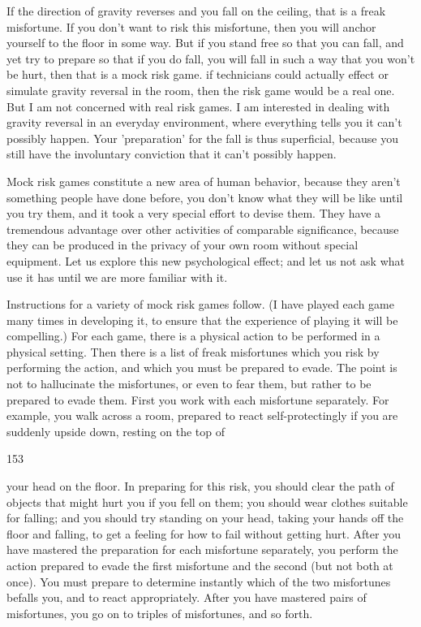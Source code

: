 \documentclass[10pt,twoside]{memoir}
\begin{document}
\begin{enumerate}
{\begin{enumerate}
\begin{sysrules}
\begin{sysrules}
\begin{sysrules}
\begin{sysrules}
If the direction of gravity reverses and you fall on the ceiling, that is a 
freak misfortune. If you don't want to risk this misfortune, then you will 
anchor yourself to the floor in some way. But if you stand free so that you 
can fall, and yet try to prepare so that if you do fall, you will fall in such a 
way that you won't be hurt, then that is a mock risk game. if technicians 
could actually effect or simulate gravity reversal in the room, then the risk 
game would be a real one. But I am not concerned with real risk games. I am 
interested in dealing with gravity reversal in an everyday environment, where 
everything tells you it can't possibly happen. Your 'preparation' for the fall 
is thus superficial, because you still have the involuntary conviction that it 
can't possibly happen. 

Mock risk games constitute a new area of human behavior, because they 
aren't something people have done before, you don't know what they will be 
like until you try them, and it took a very special effort to devise them. 
They have a tremendous advantage over other activities of comparable 
significance, because they can be produced in the privacy of your own room 
without special equipment. Let us explore this new psychological effect; and 
let us not ask what use it has until we are more familiar with it. 

Instructions for a variety of mock risk games follow. (I have played 
each game many times in developing it, to ensure that the experience of 
playing it will be compelling.) For each game, there is a physical action to be 
performed in a physical setting. Then there is a list of freak misfortunes 
which you risk by performing the action, and which you must be prepared 
to evade. The point is not to hallucinate the misfortunes, or even to fear 
them, but rather to be prepared to evade them. First you work with each 
misfortune separately. For example, you walk across a room, prepared to 
react self-protectingly if you are suddenly upside down, resting on the top of 


153 


your head on the floor. In preparing for this risk, you should clear the path 
of objects that might hurt you if you fell on them; you should wear clothes 
suitable for falling; and you should try standing on your head, taking your 
hands off the floor and falling, to get a feeling for how to fail without 
getting hurt. After you have mastered the preparation for each misfortune 
separately, you perform the action prepared to evade the first misfortune 
and the second (but not both at once). You must prepare to determine 
instantly which of the two misfortunes befalls you, and to react 
appropriately. After you have mastered pairs of misfortunes, you go on to 
triples of misfortunes, and so forth. 


\end{sysrules}
\end{sysrules}
\end{sysrules}
\end{sysrules}
\end{enumerate}}
\end{enumerate}
\end{document}
